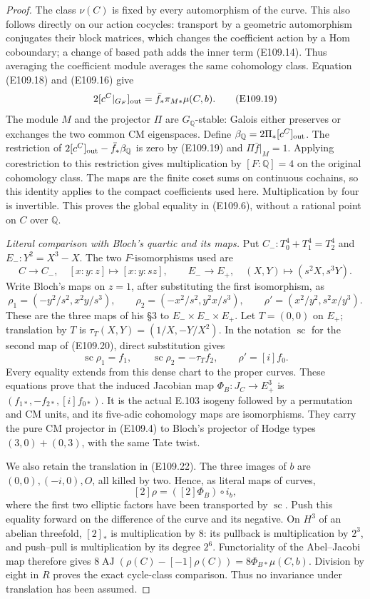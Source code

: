 \begin{proof}
The class $\nu(C)$ is fixed by every automorphism of the curve.
This also follows directly on our action cocycles: transport by
a geometric automorphism conjugates their block matrices, which
changes the coefficient action by a Hom coboundary; a change
of based path adds the inner term (E109.14).  Thus averaging
the coefficient module averages the same cohomology class.
Equation (E109.18) and (E109.16) give
\[
        2[c^C|_{G_F}]_{\rm out}
              =\bar f_*\pi_{M*}\mu(C,b).
 \tag{E109.19}
\]
The module $M$ and the projector $\Pi$ are $G_{\mathbb Q}$-stable:
Galois either preserves or exchanges the two common CM
eigenspaces.  Define $\beta_{\mathbb Q}=2\Pi_*[c^C]_{\rm out}$.
The restriction of
$2[c^C]_{\rm out}-\bar f_*\beta_{\mathbb Q}$ is zero by
(E109.19) and $\Pi\bar f|_M=1$.  Applying corestriction to this
restriction gives multiplication by $[F:\mathbb Q]=4$ on the
original cohomology class.  The maps
are the finite coset sums on continuous cochains, so this
identity applies to the compact coefficients used here.
Multiplication by four is invertible.  This proves the global
equality in (E109.6), without a rational point on $C$ over
$\mathbb Q$.

\emph{Literal comparison with Bloch's quartic and its maps.}
Put $C_-:T_0^4+T_1^4=T_2^4$ and
$E_-:Y^2=X^3-X$.  The two $F$-isomorphisms used are
\[
 C\longrightarrow C_-,\quad[x:y:z]\longmapsto[x:y:sz],
 \qquad E_-\longrightarrow E_+,\quad(X,Y)\longmapsto(s^2X,s^3Y).
 \tag{E109.20}
\]
Write Bloch's maps on $z=1$, after substituting the first
isomorphism, as
\[
 \rho_1=(-y^2/s^2,x^2y/s^3),\qquad
 \rho_2=(-x^2/s^2,y^2x/s^3),\qquad
 \rho'=(x^2/y^2,s^2x/y^3).
 \tag{E109.21}
\]
These are the three maps of his \S3 to $E_-\times E_-\times E_+$.
Let $T=(0,0)$ on $E_+$; translation by $T$ is
$\tau_T(X,Y)=(1/X,-Y/X^2)$.  In the notation $\operatorname{sc}$
for the second map of (E109.20), direct substitution gives
\[
      \operatorname{sc}\rho_1=f_1,\qquad
      \operatorname{sc}\rho_2=-\tau_Tf_2,\qquad
      \rho'=[i]f_0.
 \tag{E109.22}
\]
Every equality extends from this dense chart to the proper
curves.  These equations prove that the induced Jacobian map
$\Phi_B:J_C\to E_+^3$ is $(f_{1*},-f_{2*},[i]f_{0*})$.
It is the actual E.103 isogeny followed by a permutation and
CM units, and its five-adic cohomology maps are isomorphisms.
They carry the pure CM projector in (E109.4) to Bloch's projector
of Hodge types $(3,0)+(0,3)$, with the same Tate twist.

We also retain the translation in (E109.22).  The three images
of $b$ are $(0,0),(-i,0),O$, all killed by two.  Hence, as
literal maps of curves,
\[
               [2]\rho=([2]\Phi_B)\circ i_b,
 \tag{E109.23}
\]
where the first two elliptic factors have been transported by
$\operatorname{sc}$.  Push this equality forward on the difference
of the curve and its negative.  On $H^3$ of an abelian threefold,
$[2]_*$ is multiplication by $8$: its pullback is multiplication
by $2^3$, and push--pull is multiplication by its degree $2^6$.
Functoriality of the Abel--Jacobi map therefore gives
$8\operatorname{AJ}(\rho(C)-[-1]\rho(C))=8\Phi_{B*}\mu(C,b)$.
Division by eight in $R$ proves the exact cycle-class comparison.
Thus no invariance under translation has been assumed.


\end{proof}
